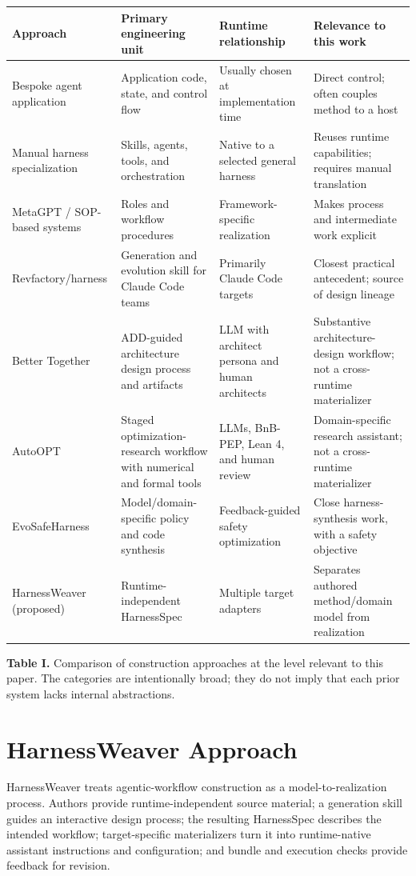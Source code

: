 \documentclass[10pt,conference]{IEEEtran}
\begin{document}
\begin{table}[t]
\centering\footnotesize\renewcommand{\arraystretch}{1.15}
\begin{tabularx}{\textwidth}{>{\raggedright\arraybackslash}X >{\raggedright\arraybackslash}X >{\raggedright\arraybackslash}X >{\raggedright\arraybackslash}X}
\toprule
Approach & Primary engineering unit & Runtime relationship & Relevance to this work\tabularnewline
\midrule
Bespoke agent application & Application code, state, and control flow & Usually chosen at implementation time & Direct control; often couples method to a host\tabularnewline
Manual harness specialization & Skills, agents, tools, and orchestration & Native to a selected general harness & Reuses runtime capabilities; requires manual translation\tabularnewline
MetaGPT / SOP-based systems & Roles and workflow procedures & Framework-specific realization & Makes process and intermediate work explicit\tabularnewline
Revfactory/harness & Generation and evolution skill for Claude Code teams & Primarily Claude Code targets & Closest practical antecedent; source of design lineage\tabularnewline
Better Together & ADD-guided architecture design process and artifacts & LLM with architect persona and human architects & Substantive architecture-design workflow; not a cross-runtime materializer\tabularnewline
AutoOPT & Staged optimization-research workflow with numerical and formal tools & LLMs, BnB-PEP, Lean 4, and human review & Domain-specific research assistant; not a cross-runtime materializer\tabularnewline
EvoSafeHarness & Model/domain-specific policy and code synthesis & Feedback-guided safety optimization & Close harness-synthesis work, with a safety objective\tabularnewline
HarnessWeaver (proposed) & Runtime-independent HarnessSpec & Multiple target adapters & Separates authored method/domain model from realization\tabularnewline
\bottomrule
\end{tabularx}
\end{table}

\textbf{Table I.} Comparison of construction approaches at the level relevant to this paper. The categories are intentionally broad; they do not imply that each prior system lacks internal abstractions.

\section{HarnessWeaver Approach}

HarnessWeaver treats agentic-workflow construction as a model-to-realization process. Authors provide runtime-independent source material; a generation skill guides an interactive design process; the resulting HarnessSpec describes the intended workflow; target-specific materializers turn it into runtime-native assistant instructions and configuration; and bundle and execution checks provide feedback for revision.
\end{document}
